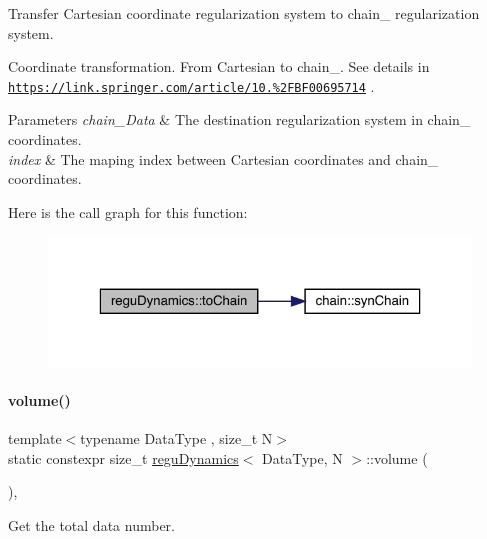 Transfer Cartesian coordinate regularization system to chain_ regularization system.

Coordinate transformation. From Cartesian to chain_. See details in \href{https://link.springer.com/article/10.1007%2FBF00695714}{\tt https\+://link.\+springer.\+com/article/10.\+1007\%2\+F\+B\+F00695714} .
\begin{DoxyParams}{Parameters}
{\em chain_\+Data} & The destination regularization system in chain_ coordinates. \\
\hline
{\em index} & The maping index between Cartesian coordinates and chain_ coordinates. \\
\hline
\end{DoxyParams}
Here is the call graph for this function\+:\nopagebreak
\begin{figure}[H]
\begin{center}
\leavevmode
\includegraphics[width=323pt]{classregu_dynamics_aae4e77bbbb00f0bdddb396047f1c0fc2_cgraph}
\end{center}
\end{figure}
\mbox{\label{classregu_dynamics_a3a00b2009ce88898871ca024c30c6882}} 
\paragraph{\texorpdfstring{volume()}{volume()}}
{\footnotesize\ttfamily template$<$typename Data\+Type , size\+\_\+t N$>$ \\
static constexpr size\+\_\+t \mbox{\hyperlink{classregu_dynamics}{regu\+Dynamics}}$<$ Data\+Type, N $>$\+::volume (\begin{DoxyParamCaption}{ }\end{DoxyParamCaption})\hspace{0.3cm}{\ttfamily [inline]}, {\ttfamily [static]}}



Get the total data number. 

